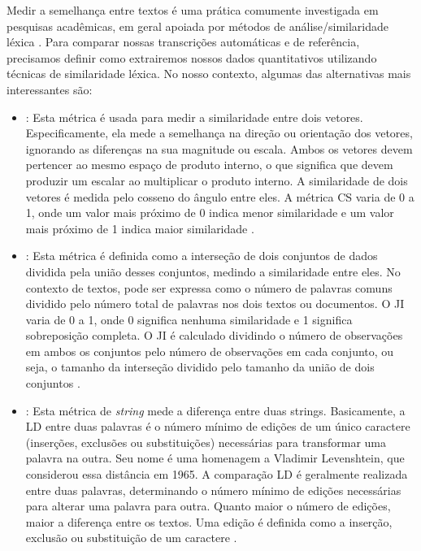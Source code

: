 Medir a semelhança entre textos é uma prática comumente investigada em pesquisas acadêmicas, em geral apoiada por métodos de análise/similaridade léxica \cite{Majumdar2022}. Para comparar nossas transcrições automáticas e de referência, precisamos definir como extrairemos nossos dados quantitativos utilizando técnicas de similaridade léxica. No nosso contexto, algumas das alternativas mais interessantes são:

\begin{itemize}

\item \textbf{}: Esta métrica é usada para medir a similaridade entre dois vetores. Especificamente, ela mede a semelhança na direção ou orientação dos vetores, ignorando as diferenças na sua magnitude ou escala. Ambos os vetores devem pertencer ao mesmo espaço de produto interno, o que significa que devem produzir um escalar ao multiplicar o produto interno. A similaridade de dois vetores é medida pelo cosseno do ângulo entre eles. A métrica CS varia de 0 a 1, onde um valor mais próximo de 0 indica menor similaridade e um valor mais próximo de 1 indica maior similaridade \cite{cosseno-1,cosseno-2,cosseno-3}.

\item \textbf{}: Esta métrica é definida como a interseção de dois conjuntos de dados dividida pela união desses conjuntos, medindo a similaridade entre eles. No contexto de textos, pode ser expressa como o número de palavras comuns dividido pelo número total de palavras nos dois textos ou documentos. O JI varia de 0 a 1, onde 0 significa nenhuma similaridade e 1 significa sobreposição completa. O JI é calculado dividindo o número de observações em ambos os conjuntos pelo número de observações em cada conjunto, ou seja, o tamanho da interseção dividido pelo tamanho da união de dois conjuntos \cite{Majumdar2022,jaccard-1,jaccard-2}.

\item \textbf{}: Esta métrica de \textit{string} mede a diferença entre duas strings. Basicamente, a LD entre duas palavras é o número mínimo de edições de um único caractere (inserções, exclusões ou substituições) necessárias para transformar uma palavra na outra. Seu nome é uma homenagem a Vladimir Levenshtein, que considerou essa distância em 1965. A comparação LD é geralmente realizada entre duas palavras, determinando o número mínimo de edições necessárias para alterar uma palavra para outra. Quanto maior o número de edições, maior a diferença entre os textos. Uma edição é definida como a inserção, exclusão ou substituição de um caractere \cite{levens-1,levens-2}.

\end{itemize}

